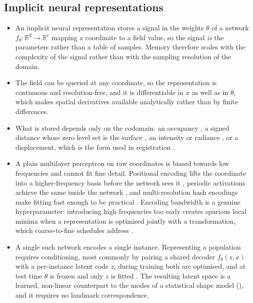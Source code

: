 \subsection{Implicit neural representations}
\label{sec:bg-inr}
\begin{itemize}
\item An implicit neural representation stores a signal in the weights $\theta$ of a network $f_\theta : \mathbb{R}^d \to \mathbb{R}^c$ mapping a coordinate to a field value, so the signal \emph{is} the parameters rather than a table of samples. Memory therefore scales with the complexity of the signal rather than with the sampling resolution of the domain.
\item The field can be queried at any coordinate, so the representation is continuous and resolution-free, and it is differentiable in $x$ as well as in $\theta$, which makes spatial derivatives available analytically rather than by finite differences.
\item What is stored depends only on the codomain: an occupancy \citep{mescheder2019occupancy}, a signed distance whose zero level set is the surface \citep{park2019deepsdf}, an intensity or radiance \citep{mildenhall2021nerf}, or a displacement, which is the form used in registration \citep{pmlr-v172-wolterink22a}.
\item A plain multilayer perceptron on raw coordinates is biased towards low frequencies and cannot fit fine detail. Positional encoding lifts the coordinate into a higher-frequency basis before the network sees it \citep{tancik2020fourier, mildenhall2021nerf}, periodic activations achieve the same inside the network \citep{sitzmann2020siren}, and multi-resolution hash encodings make fitting fast enough to be practical \citep{muller2022instant}. Encoding bandwidth is a genuine hyperparameter: introducing high frequencies too early creates spurious local minima when a representation is optimised jointly with a transformation, which coarse-to-fine schedules address \citep{lin2021barf}.
\item A single such network encodes a single instance. Representing a population requires conditioning, most commonly by pairing a shared decoder $f_\theta(z, x)$ with a per-instance latent code $z$; during training both are optimised, and at test time $\theta$ is frozen and only $z$ is fitted \citep{park2019deepsdf}. The resulting latent space is a learned, non-linear counterpart to the modes of a statistical shape model (), and it requires no landmark correspondence.

\end{itemize}
